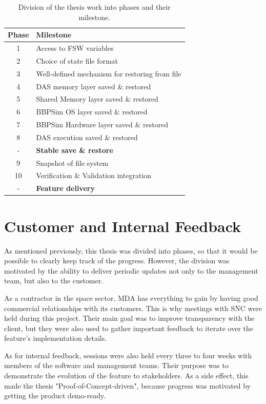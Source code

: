 {\begin{table}[htbp]
	\centering
	\begin{tabularx}{\linewidth}{c X}
	\toprule
	\textbf{Phase} & \textbf{Milestone}\\
	\midrule
	1 & {Access to \gls{FSW} variables}\\
	2 & {Choice of state file format}\\
	3 & {Well-defined mechanism for restoring from file}\\
	4 & {\gls{DAS} memory layer saved \& restored}\\	
	5 & {Shared Memory layer saved \& restored}\\
	6 & {\gls{BBPSim} OS layer saved \& restored}\\
	7 & {\gls{BBPSim} Hardware layer saved \& restored}\\
	8 & {\gls{DAS} execution saved \& restored}\\
	\cmidrule{2-2} 
	-  & \textbf{Stable save \& restore}\\
	\cmidrule{2-2} 
	9 & {Snapshot of file system}\\
	10 & {Verification \& Validation integration}\\
	\cmidrule{2-2} 
	- & \textbf{Feature delivery}\\
	\bottomrule
	\end{tabularx}
	\caption{Division of the thesis work into phases and their milestone.}
	\label{tbl:project-phases}
\end{table}

\section{Customer and Internal Feedback}\label{sec:feedback}
As mentioned previously, this thesis was divided into phases, so that it would be possible to clearly keep track of the progress. However, the division was motivated by the ability to deliver periodic updates not only to the management team, but also to the customer.

As a contractor in the space sector, \gls{MDA} has everything to gain by having good commercial relationships with its customers. This is why meetings with \gls{SNC} were held during this project. Their main goal was to improve transparency with the client, but they were also used to gather important feedback to iterate over the feature's implementation details. 

As for internal feedback, sessions were also held every three to four weeks with members of the software and management teams. Their purpose was to demonstrate the evolution of the feature to stakeholders. As a side effect, this made the thesis "Proof-of-Concept-driven", because progress was motivated by getting the product demo-ready.
}